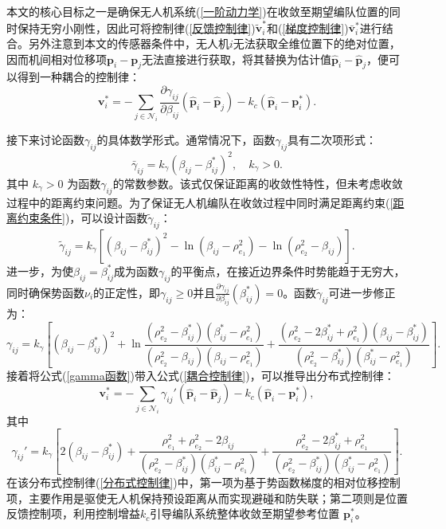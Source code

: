 本文的核心目标之一是确保无人机系统(\ref{一阶动力学})在收敛至期望编队位置的同时保持无穷小刚性，因此可将控制律(\ref{反馈控制律})$\tilde{\mathbf{v}}_i^*$和(\ref{梯度控制律})$\bar{\mathbf{v}}_i^*$进行结合。另外注意到本文的传感器条件中，无人机$i$无法获取全维位置下的绝对位置，因而机间相对位移项$\mathbf{p}_i - \mathbf{p}_j$无法直接进行获取，将其替换为估计值$\hat{\mathbf{p}}_i - \hat{\mathbf{p}}_j$，便可以得到一种耦合的控制律：
\begin{equation}
	\mathbf{v}_i^* = 
	-\sum_{j \in  \mathcal{N}_i} \frac{\partial \gamma_{ij}}{\partial \beta_{ij}} (\hat{\mathbf{p}}_i - \hat{\mathbf{p}}_j) 
	-k_c (\hat{\mathbf{p}}_i - \mathbf{p}^*_i).
	\label{耦合控制律}
\end{equation}

接下来讨论函数$\gamma_{ij}$的具体数学形式。通常情况下，函数$\gamma_{ij}$具有二次项形式：
\begin{equation}
	\bar{\gamma}_{ij} = k_\gamma (\beta_{ij}-\beta_{ij}^*)^2,
	\quad
	k_\gamma > 0.
\end{equation}
其中 $k_\gamma > 0$ 为函数$\gamma_{ij}$的常数参数。该式仅保证距离的收敛性特性，但未考虑收敛过程中的距离约束问题。为了保证无人机编队在收敛过程中同时满足距离约束(\ref{距离约束条件})，可以设计函数$ \tilde{\gamma}_{ij} $：
\begin{equation}
	\tilde{\gamma}_{ij} = 
	k_\gamma[
		(\beta_{ij}-\beta_{ij}^*)^2 - 
		\ln (\beta_{ij}-\rho_{e_1}^2) - 
		\ln (\rho_{e_2}^2-\beta_{ij})
	].
\end{equation}
进一步，为使$\beta_{ij}=\beta_{ij}^*$成为函数$\gamma_{ij}$的平衡点，在接近边界条件时势能趋于无穷大，同时确保势函数$\nu_i$的正定性，即$\gamma_{ij} \ge 0$并且$\frac{\partial \gamma_{ij}}{\partial \beta_{ij}}(\beta_{ij}^*)=0$。函数$\tilde{\gamma}_{ij}$可进一步修正为：
\begin{equation}
	\gamma_{ij} = k_\gamma \left[ (\beta_{ij} - \beta_{ij}^*)^2 + \ln \frac{(\rho_{e_2}^2 - \beta_{ij}^*)(\beta_{ij}^* - \rho_{e_1}^2)}{(\rho_{e_2}^2 - \beta_{ij})(\beta_{ij} - \rho_{e_1}^2)}  + \frac{(\rho_{e_2}^2 - 2\beta_{ij}^* + \rho_{e_1}^2)(\beta_{ij} - \beta_{ij}^*)}{(\rho_{e_2}^2 - \beta_{ij}^*)(\beta_{ij}^* - \rho_{e_1}^2)}
	\right].
	\label{gamma函数}
\end{equation}
接着将公式(\ref{gamma函数})带入公式(\ref{耦合控制律})，可以推导出分布式控制律：
\begin{equation}
	\mathbf{v}_i^* = 
	- \sum_{j \in \mathcal{N}_i} \gamma_{ij}' (\hat{\mathbf{p}}_i - \hat{\mathbf{p}}_j) 
	- k_c (\hat{\mathbf{p}}_i - {\mathbf{p}}_i^*),
	\label{分布式控制律}
\end{equation}
其中
\begin{equation}
	\gamma_{ij}' = 
	k_\gamma \left[ 2(\beta_{ij} - \beta_{ij}^*) + 
	\frac{\rho_{e_1}^2+\rho_{e_2}^2-2\beta_{ij}}{(\rho_{e_2}^2-\beta_{ij}^*)(\beta_{ij}^* - \rho_{e_1}^2)}  + 
	\frac{\rho_{e_2}^2-2\beta_{ij}^*+\rho_{e_1}^2}{(\rho_{e_2}^2-\beta_{ij}^*)(\beta_{ij}^*-\rho_{e_1}^2)}
	\right].
\end{equation}
在该分布式控制律(\ref{分布式控制律})中，第一项为基于势函数梯度的相对位移控制项，主要作用是驱使无人机保持预设距离从而实现避碰和防失联；第二项则是位置反馈控制项，利用控制增益$k_c$引导编队系统整体收敛至期望参考位置 $\mathbf{p}_i^*$。

